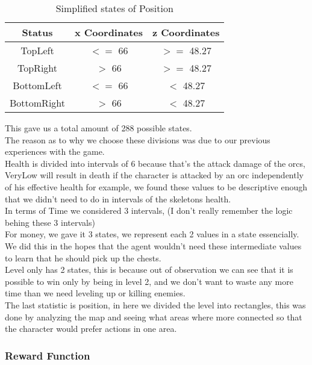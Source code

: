 \documentclass{article}
\begin{document}
  \begin{table}[h!]
    \centering
    \caption{Simplified states of Position}
    \label{tab:tableA*5}
    \begin{tabular}{c|c|c}
      \textbf{Status} & \textbf{x Coordinates} & \textbf{z Coordinates}\\
      \hline
      TopLeft & $<=$ 66 & $>=$ 48.27\\
      TopRight & $>$ 66 & $>=$ 48.27\\
      BottomLeft & $<=$ 66 & $<$ 48.27\\
      BottomRight & $>$ 66 & $<$ 48.27\\
    \end{tabular}
  \end{table}

  This gave us a total amount of 288 possible states.\\
  The reason as to why we choose these divisions was due to our previous experiences with the game.\\
  Health is divided into intervals of 6 because that's the attack damage of the orcs, VeryLow will result in death if the
  character is attacked by an orc independently of his effective health for example, we found these values to be descriptive enough that we
  didn't need to do in intervals of the skeletons health.\\
  In terms of Time we considered 3 intervals, (I don't really remember the logic behing these 3 intervals)\\
  For money, we gave it 3 states, we represent each 2 values in a state essencially. We did this in the hopes that the agent wouldn't need these intermediate values to learn that he should pick up the chests.\\
  Level only has 2 states, this is because out of observation we can see that it is possible to win only by being in level 2, and we don't want
  to waste any more time than we need leveling up or killing enemies.\\
  The last statistic is position, in here we divided the level into rectangles, this was done by analyzing the map and seeing what areas where more
  connected so that the character would prefer actions in one area.\\

  \subsubsection{Reward Function}
\end{document}
